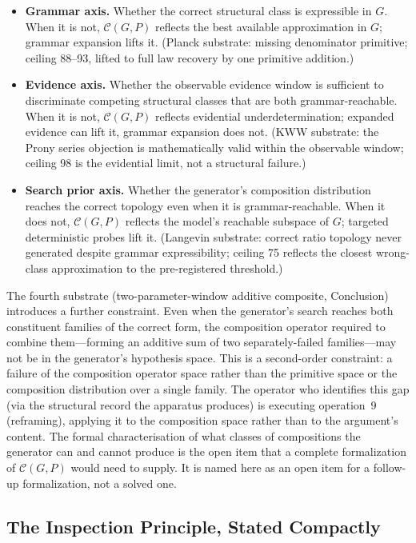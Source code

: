 \documentclass[11pt]{article}
\begin{document}
\begin{itemize}
\item \textbf{Grammar axis.} Whether the correct structural class is expressible in $G$. When it is not, $\mathcal{C}(G, P)$ reflects the best available approximation in $G$; grammar expansion lifts it. (Planck substrate: missing denominator primitive; ceiling 88--93, lifted to full law recovery by one primitive addition.)
\item \textbf{Evidence axis.} Whether the observable evidence window is sufficient to discriminate competing structural classes that are both grammar-reachable. When it is not, $\mathcal{C}(G, P)$ reflects evidential underdetermination; expanded evidence can lift it, grammar expansion does not. (KWW substrate: the Prony series objection is mathematically valid within the observable window; ceiling 98 is the evidential limit, not a structural failure.)
\item \textbf{Search prior axis.} Whether the generator's composition distribution reaches the correct topology even when it is grammar-reachable. When it does not, $\mathcal{C}(G, P)$ reflects the model's reachable subspace of $G$; targeted deterministic probes lift it. (Langevin substrate: correct ratio topology never generated despite grammar expressibility; ceiling 75 reflects the closest wrong-class approximation to the pre-registered threshold.)
\end{itemize}

The fourth substrate (two-parameter-window additive composite, Conclusion) introduces a further constraint. Even when the generator's search reaches both constituent families of the correct form, the composition operator required to combine them---forming an additive sum of two separately-failed families---may not be in the generator's hypothesis space. This is a second-order constraint: a failure of the composition operator space rather than the primitive space or the composition distribution over a single family. The operator who identifies this gap (via the structural record the apparatus produces) is executing operation~9 (reframing), applying it to the composition space rather than to the argument's content. The formal characterisation of what classes of compositions the generator can and cannot produce is the open item that a complete formalization of $\mathcal{C}(G, P)$ would need to supply. It is named here as an open item for a follow-up formalization, not a solved one.

\subsection{The Inspection Principle, Stated Compactly}
\end{document}
